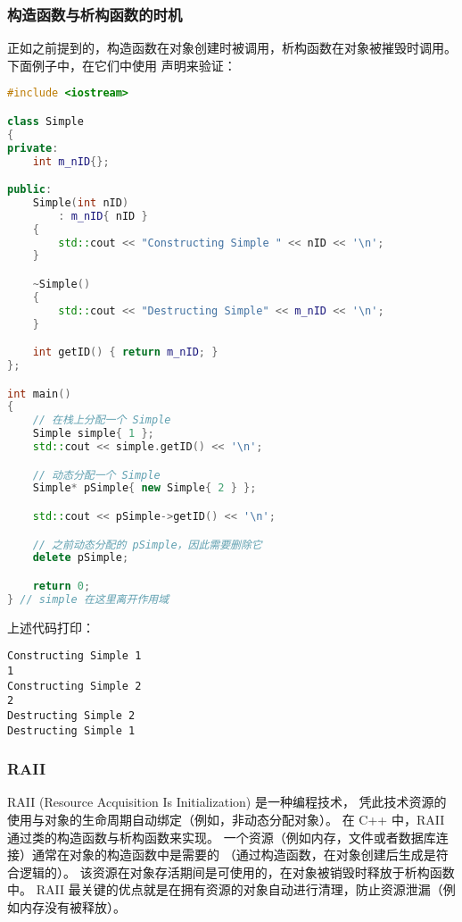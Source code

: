 \documentclass[../../LearnCpp.tex]{subfiles}
\begin{document}
\subsubsection*{构造函数与析构函数的时机}

正如之前提到的，构造函数在对象创建时被调用，析构函数在对象被摧毁时调用。
下面例子中，在它们中使用  声明来验证：

\begin{lstlisting}[language=C++]
#include <iostream>

class Simple
{
private:
    int m_nID{};

public:
    Simple(int nID)
        : m_nID{ nID }
    {
        std::cout << "Constructing Simple " << nID << '\n';
    }

    ~Simple()
    {
        std::cout << "Destructing Simple" << m_nID << '\n';
    }

    int getID() { return m_nID; }
};

int main()
{
    // 在栈上分配一个 Simple
    Simple simple{ 1 };
    std::cout << simple.getID() << '\n';

    // 动态分配一个 Simple
    Simple* pSimple{ new Simple{ 2 } };

    std::cout << pSimple->getID() << '\n';

    // 之前动态分配的 pSimple，因此需要删除它
    delete pSimple;

    return 0;
} // simple 在这里离开作用域
\end{lstlisting}

上述代码打印：

\begin{lstlisting}
Constructing Simple 1
1
Constructing Simple 2
2
Destructing Simple 2
Destructing Simple 1
\end{lstlisting}

\subsubsection*{RAII}

RAII (Resource Acquisition Is Initialization) 是一种编程技术，
凭此技术资源的使用与对象的生命周期自动绑定（例如，非动态分配对象）。
在 C++ 中，RAII 通过类的构造函数与析构函数来实现。
一个资源（例如内存，文件或者数据库连接）通常在对象的构造函数中是需要的
（通过构造函数，在对象创建后生成是符合逻辑的）。
该资源在对象存活期间是可使用的，在对象被销毁时释放于析构函数中。
RAII 最关键的优点就是在拥有资源的对象自动进行清理，防止资源泄漏（例如内存没有被释放）。
\end{document}
